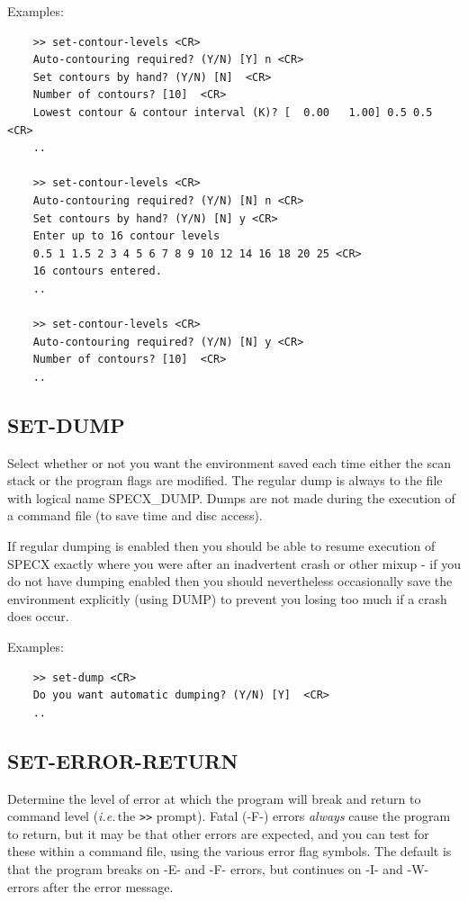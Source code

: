 \documentclass[11pt,twoside]{report}
\newcommand{\ie}{{\it i.e.\,}}
\begin{document}
Examples:
\begin{verbatim}
    >> set-contour-levels <CR>
    Auto-contouring required? (Y/N) [Y] n <CR>
    Set contours by hand? (Y/N) [N]  <CR>
    Number of contours? [10]  <CR>
    Lowest contour & contour interval (K)? [  0.00   1.00] 0.5 0.5 <CR>
    ..

    >> set-contour-levels <CR>
    Auto-contouring required? (Y/N) [N] n <CR>
    Set contours by hand? (Y/N) [N] y <CR>
    Enter up to 16 contour levels
    0.5 1 1.5 2 3 4 5 6 7 8 9 10 12 14 16 18 20 25 <CR>
    16 contours entered.
    ..

    >> set-contour-levels <CR>
    Auto-contouring required? (Y/N) [N] y <CR>
    Number of contours? [10]  <CR>
    ..
\end{verbatim}

\subsection{SET-DUMP} 

Select whether or not you want the environment saved each time either the
 scan stack or the program flags are
modified. The regular dump is always to the file with logical name SPECX\_DUMP.
 
Dumps are not made during the execution of a command file
(to save time and disc access).

If regular dumping is enabled then you should be able to resume execution of
SPECX exactly where you were after an inadvertent crash or other mixup - if you
do not have dumping enabled then you should nevertheless occasionally save the
environment explicitly (using DUMP)  to prevent you losing too much
if a crash does occur.

Examples:
\begin{verbatim}
    >> set-dump <CR>
    Do you want automatic dumping? (Y/N) [Y]  <CR>
    ..
\end{verbatim}

\subsection{SET-ERROR-RETURN} 

Determine the level of error at which the  program will break and return
to command level (\ie the \verb+>>+ prompt). Fatal (-F-) errors {\em always}
cause the program to return, but it may be that other errors are expected,
and you can test for these within a command file, using the various error
flag symbols. The default is that the program breaks on -E- and -F- errors,
but continues on -I- and -W- errors after the error message.
\end{document}
